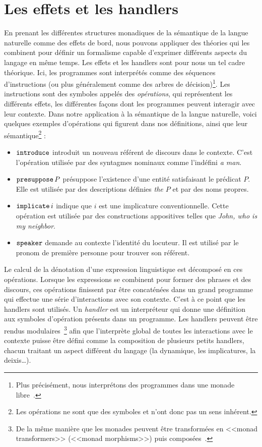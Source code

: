 \section*{Les effets et les handlers}

En prenant les différentes structures monadiques de la sémantique de la langue
naturelle comme des effets de bord, nous pouvons appliquer des théories qui les 
combinent pour définir un formalisme capable d'exprimer différents aspects du langage 
en même temps. Les effets et les handlers sont pour nous un tel
cadre théorique. Ici, les programmes sont interprétés comme des
séquences d'instructions (ou plus généralement comme des arbres de
décision)\footnote{Plus précisément, nous interprétons des programmes dans une
  monade libre~\cite{swierstra2008data}.}. Les instructions sont des symboles
appelés des \emph{opérations}, qui représentent les différents effets, les
différentes façons dont les programmes peuvent interagir avec leur contexte.
Dans notre application à la sémantique de la langue naturelle, voici quelques
exemples d'opérations qui figurent dans nos définitions, ainsi que leur
sémantique\footnote{Les opérations ne sont que des symboles et n'ont donc pas
  un sens inhérent.} :

\begin{itemize}
\item $\mathtt{introduce}$ introduit un nouveau référent de discours dans le
  contexte. C'est l'opération utilisée par des syntagmes nominaux comme
  l'indéfini \emph{a man}.
\item $\mathtt{presuppose}\,P$ présuppose l'existence d'une entité satisfaisant
  le prédicat $P$. Elle est utilisée par des descriptions définies \emph{the $P$}
  et par des noms propres.
\item $\mathtt{implicate}\,i$ indique que $i$ est une implicature
  conventionnelle. Cette opération est utilisée par des constructions
  appositives telles que \emph {John, who is my neighbor}.
\item $\mathtt{speaker}$ demande au contexte l'identité du locuteur. Il est utilisé
  par le pronom de première personne pour trouver son référent.
\end{itemize}

Le calcul de la dénotation d'une expression linguistique est décomposé en ces
opérations. Lorsque les expressions se combinent pour former des phrases et des
discours, ces opérations finissent par être concaténées dans un grand programme
qui effectue une série d'interactions avec son contexte. C'est à ce point que
les handlers sont utilisés. Un \emph{handler} est un interpréteur qui donne une
définition aux symboles d'opération présents dans un programme. Les handlers peuvent être
rendus modulaires~\footnote{De la même manière que les monades peuvent être
  transformées en <<monad transformers>> (<<monad morphisms>>) puis
  composées~\cite{shan2002monads,wu2015transformers}.} afin que l'interprète
global de toutes les interactions avec le contexte puisse être défini comme la
composition de plusieurs petits handlers, chacun traitant un aspect différent du
langage (la dynamique, les implicatures, la deixis\ldots).

